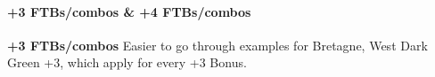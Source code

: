 

\paragraph{+3 FTBs/combos \& +4 FTBs/combos}

\textbf{+3 FTBs/combos}
Easier to go through examples for Bretagne, West Dark Green +3, which apply for every +3 Bonus.


